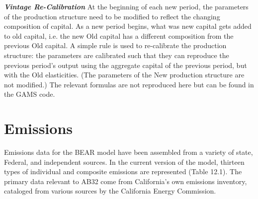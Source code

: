 \documentclass[12pt]{article}
\begin{document}
\textbf{\textit{Vintage Re-Calibration}}
At the beginning of each new period, the parameters of the production structure need to be modified to reflect the changing composition of capital. As a new period begins, what was new capital gets added to old capital, i.e. the new Old capital has a different composition from the previous Old capital. A simple rule is used to re-calibrate the production structure: the parameters are calibrated such that they can reproduce the previous period’s output using the aggregate capital of the previous period, but with the Old elasticities. (The parameters of the New production structure are not modified.) The relevant formulas are not reproduced here but can be found in the GAMS code.


\section{Emissions}

Emissions data for the BEAR model have been assembled from a variety of state, Federal, and independent sources. In the current version of the model, thirteen types of individual and composite emissions are represented (Table 12.1). The primary data relevant to AB32 come from California's own emissions inventory, cataloged from various sources by the California Energy Commission.
\end{document}
